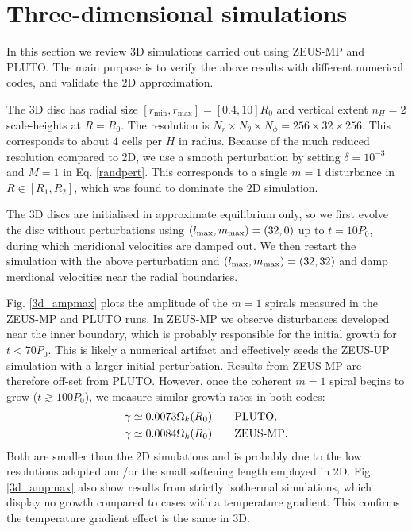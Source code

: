 \section{Three-dimensional simulations}\label{results3d}
In this section we review 3D simulations carried 
out using ZEUS-MP and PLUTO. The main purpose is to verify 
the above results with different numerical codes, and validate  
the 2D approximation.    

The 3D disc has radial size
$[r_\mathrm{min},r_\mathrm{max}]=[0.4,10]R_0$ and vertical extent  
$n_H=2$ scale-heights at $R=R_0$. The resolution is $N_r\times N_\theta\times
N_\phi=256\times32\times256$. This corresponds to about $4$ cells per
$H$ in radius. Because of the much reduced resolution 
compared to 2D, we use a smooth perturbation by setting
$\delta = 10^{-3}$ and $M=1$ in Eq. \ref{randpert}. This corresponds
to a single $m=1$ disturbance in $R\in[R_1,R_2]$, which was found to dominate
the 2D simulation.  

The 3D discs are initialised in approximate equilibrium only, so we
first evolve the disc without perturbations using  
$(l_\mathrm{max},m_\mathrm{max})=(32,0)$ up to $t=10P_0$, during which 
meridional velocities are damped out. We then restart the simulation
with the above perturbation and $(l_\mathrm{max},m_\mathrm{max})=(32,32)$ and damp
merdional velocities near the radial boundaries. 

Fig. \ref{3d_ampmax} plots the amplitude of the $m=1$ spirals measured
in the ZEUS-MP and PLUTO runs. 
In ZEUS-MP we observe disturbances developed near
the inner boundary, which is probably responsible for the initial growth
for $t<70P_0$. This is likely a numerical artifact and effectively seeds
the ZEUS-UP simulation with a larger initial perturbation. Results
from ZEUS-MP are therefore off-set from PLUTO. However,
once the coherent $m=1$ spiral begins to grow ($t\gtrsim 100P_0$), 
we measure similar growth rates in both codes: 
\begin{align*}
  &\gamma \simeq 0.0073\Omega_k(R_0) \quad\quad \mathrm{PLUTO},\\
  &\gamma \simeq 0.0084\Omega_k(R_0) \quad\quad {\operatorname{ZEUS-MP}}.
\end{align*}
Both are smaller than the 2D simulations and is probably due to the
low resolutions adopted and/or the small softening length employed in
2D.  Fig. \ref{3d_ampmax} also show results from strictly isothermal
simulations, which display no growth compared to cases with a 
temperature gradient. This confirms the temperature gradient effect is
the same in 3D. 

